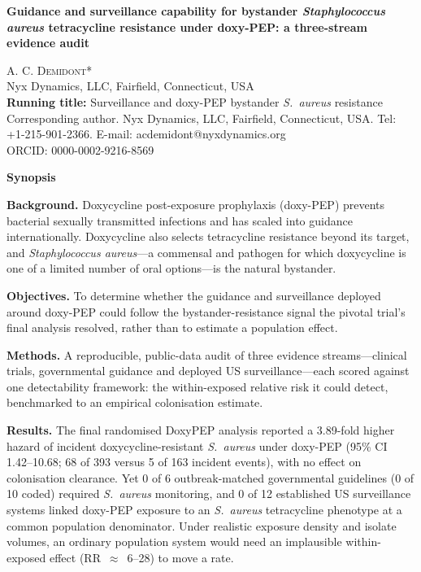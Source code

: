 \documentclass[12pt,a4paper]{article}
\newcommand{\sa}{\emph{S.~aureus}}
\newcommand{\Sa}{\emph{Staphylococcus aureus}}
\begin{document}
\begin{center}
{\Large\bfseries Guidance and surveillance capability for bystander \Sa{}
tetracycline resistance under doxy-PEP: a three-stream evidence audit}\\[1.2em]
\end{center}

\noindent A. C. \textsc{Demidont}*\\[0.6em]
\noindent Nyx Dynamics, LLC, Fairfield, Connecticut, USA\\[0.6em]

\noindent\textbf{Running title:} Surveillance and doxy-PEP bystander \sa{} resistance\\[0.6em]

\noindent*Corresponding author. Nyx Dynamics, LLC, Fairfield, Connecticut, USA.
Tel: +1-215-901-2366. E-mail: acdemidont@nyxdynamics.org\\
\noindent ORCID: 0000-0002-9216-8569

\vspace{1.5em}

\noindent\textbf{\large Synopsis}

\smallskip
\noindent\textbf{Background.} Doxycycline post-exposure prophylaxis (doxy-PEP)
prevents bacterial sexually transmitted infections and has scaled into guidance
internationally. Doxycycline also selects tetracycline resistance beyond its
target, and \Sa{}---a commensal and pathogen for which doxycycline is one of a
limited number of oral options---is the natural bystander.

\noindent\textbf{Objectives.} To determine whether the guidance and surveillance
deployed around doxy-PEP could follow the bystander-resistance signal the pivotal
trial's final analysis resolved, rather than to estimate a population effect.

\noindent\textbf{Methods.} A reproducible, public-data audit of three evidence
streams---clinical trials, governmental guidance and deployed US
surveillance---each scored against one detectability framework: the within-exposed relative
risk it could detect, benchmarked to an empirical colonisation estimate.

\noindent\textbf{Results.} The final randomised DoxyPEP analysis reported a
3.89-fold higher hazard of incident doxycycline-resistant \sa{} under doxy-PEP
(95\% CI 1.42--10.68; 68 of 393 versus 5 of 163 incident events), with no effect
on colonisation clearance. Yet 0 of 6 outbreak-matched governmental guidelines (0 of 10 coded)
required \sa{} monitoring, and 0 of 12 established US surveillance systems linked
doxy-PEP exposure to an \sa{} tetracycline phenotype at a common population
denominator. Under realistic exposure density and isolate volumes, an ordinary
population system would need an implausible within-exposed effect
(RR~$\approx$~6--28) to move a rate.
\end{document}
